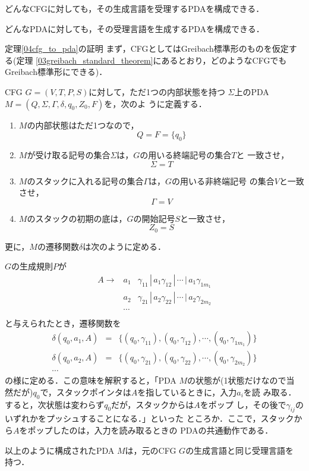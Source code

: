 \begin{mytheorem} \label{04cfg_to_pda}
 どんなCFGに対しても，その生成言語を受理するPDAを構成できる．
\end{mytheorem}

\begin{mytheorem} \label{04pda_to_cfg}
 どんなPDAに対しても，その受理言語を生成するPDAを構成できる．
\end{mytheorem}

\begin{myproof}{定理\ref{04cfg_to_pda}の証明} \label{proof:04cfg_to_pda}
\footnotemark
まず，CFGとしてはGreibach標準形のものを仮定する(定理
 \ref{03greibach_standard_theorem}にあるとおり，どのようなCFGでも
 Greibach標準形にできる)．

CFG $G = (V, T, P, S)$に対して，ただ1つの内部状態を持つ
$\Sigma$上のPDA $M = (Q, \Sigma, \Gamma, \delta, q_0, Z_0, F)$を，次のよ
 うに定義する．

\begin{enumerate}
 \item $M$の内部状態はただ1つなので，
       \[
       Q = F = \{q_0\}
       \]
 \item $M$が受け取る記号の集合$\Sigma$は，$G$の用いる終端記号の集合$T$と
       一致させ，
       \[
        \Sigma = T
       \]
 \item $M$のスタックに入れる記号の集合$\Gamma$は，$G$の用いる非終端記号
       の集合$V$と一致させ，
       \[
        \Gamma = V
       \]
 \item $M$のスタックの初期の底は，$G$の開始記号$S$と一致させ，
       \[
        Z_0 = S
       \]
\end{enumerate}
更に，$M$の遷移関数$\delta$は次のように定める．

$G$の生成規則$P$が
 \begin{eqnarray*}
  A \rightarrow &a_1& \gamma_{11} \, | \, a_1 \gamma_{12} \, | \, \cdots
 \, | \, a_1 \gamma_{1m_1} \\
  &a_2& \gamma_{21} \, | \, a_2 \gamma_{22} \, | \, \cdots
 \, | \, a_2 \gamma_{2m_2} \\
  &\cdots& \\
 \end{eqnarray*}
 と与えられたとき，遷移関数を
 \begin{eqnarray*}
  \delta (q_0, a_1, A) &=& \{(q_0, \gamma_{11}), (q_0, \gamma_{12}), \cdots ,
 (q_0, \gamma_{1m_1})\} \\
  \delta (q_0, a_2, A) &=& \{(q_0, \gamma_{21}), (q_0, \gamma_{22}), \cdots ,
 (q_0, \gamma_{2m_2})\} \\
  \cdots
 \end{eqnarray*}
 の様に定める．この意味を解釈すると，「PDA $M$の状態が(1状態だけなので当
 然だが)$q_0$で，スタックポインタは$A$を指しているときに，入力$a_i$を読
 み取る．すると，次状態は変わらず$q_0$だが，スタックからは$A$をポップ
 し，その後で$\gamma_{ij}$のいずれかをプッシュすることになる．」といった
 ところか．ここで，スタックから$A$をポップしたのは，入力を読み取るときの
 PDAの共通動作である．

 以上のように構成されたPDA $M$は，元のCFG $G$の生成言語と同じ受理言語を
 持つ． \footnotemark
\end{myproof}
